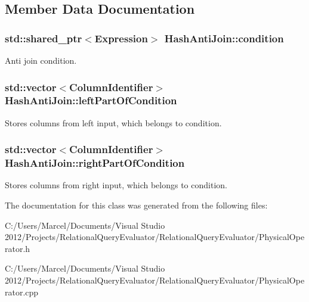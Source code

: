 \subsection{Member Data Documentation}
\hypertarget{class_hash_anti_join_a94f542040c9ee014a520ddf0b9267ff2}{
\subsubsection[{condition}]{\setlength{\rightskip}{0pt plus 5cm}std\+::shared\+\_\+ptr$<${\bf Expression}$>$ Hash\+Anti\+Join\+::condition}}\label{class_hash_anti_join_a94f542040c9ee014a520ddf0b9267ff2}
Anti join condition. \hypertarget{class_hash_anti_join_a7f63b0f5f9cbcde2c6c8819d25b0b68d}{
\subsubsection[{left\+Part\+Of\+Condition}]{\setlength{\rightskip}{0pt plus 5cm}std\+::vector$<${\bf Column\+Identifier}$>$ Hash\+Anti\+Join\+::left\+Part\+Of\+Condition}}\label{class_hash_anti_join_a7f63b0f5f9cbcde2c6c8819d25b0b68d}
Stores columns from left input, which belongs to condition. \hypertarget{class_hash_anti_join_a7dc5742715a982de107f7703ef01d95b}{
\subsubsection[{right\+Part\+Of\+Condition}]{\setlength{\rightskip}{0pt plus 5cm}std\+::vector$<${\bf Column\+Identifier}$>$ Hash\+Anti\+Join\+::right\+Part\+Of\+Condition}}\label{class_hash_anti_join_a7dc5742715a982de107f7703ef01d95b}
Stores columns from right input, which belongs to condition. 

The documentation for this class was generated from the following files\+:\begin{DoxyCompactItemize}
\item 
C\+:/\+Users/\+Marcel/\+Documents/\+Visual Studio 2012/\+Projects/\+Relational\+Query\+Evaluator/\+Relational\+Query\+Evaluator/Physical\+Operator.\+h\item 
C\+:/\+Users/\+Marcel/\+Documents/\+Visual Studio 2012/\+Projects/\+Relational\+Query\+Evaluator/\+Relational\+Query\+Evaluator/Physical\+Operator.\+cpp\end{DoxyCompactItemize}
